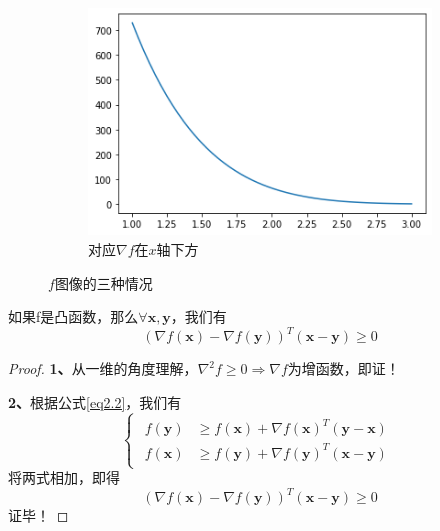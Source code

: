 \documentclass[lang=cn,10pt]{elegantbook}
\newcommand\bv[1]{\boldsymbol{#1}}
\begin{document}
\begin{figure}[h]
	\begin{subfigure}{0.4\linewidth}
		\includegraphics[width=\linewidth]{img/cf4_6.png}
		\caption{对应$\nabla f$在$x$轴下方}
		\label{cf4_6}
	\end{subfigure}
	\caption{$f$图像的三种情况}
	\label{cf42}
\end{figure}

\begin{corollary}
	如果f是凸函数，那么$\forall \bv{x,y}$，我们有
	\begin{equation}
		(\nabla f(\bv{x}) - \nabla f(\bv{y}))^T (\bv{x-y}) \geq 0
	\end{equation}
\end{corollary}

\begin{proof}
	\textbf{1、}从一维的角度理解，$\nabla^2 f \geq 0 \Rightarrow \nabla f$为增函数，即证！

	\textbf{2、}根据公式\ref{eq2.2}，我们有
	\begin{equation*}
		\begin{cases}
			\begin{aligned}
				f(\bv{y}) & \geq f(\bv{x}) + \nabla f(\bv{x})^T (\bv{y-x}) \\
				f(\bv{x}) & \geq f(\bv{y}) + \nabla f(\bv{y})^T (\bv{x-y})
			\end{aligned}
		\end{cases}
	\end{equation*}
	将两式相加，即得
	\begin{equation*}
		(\nabla f(\bv{x}) - \nabla f(\bv{y}))^T (\bv{x-y}) \geq 0
	\end{equation*}
	证毕！
\end{proof}
\end{document}
